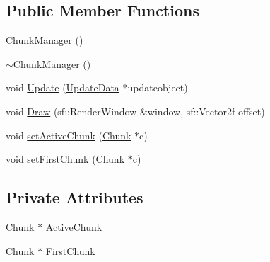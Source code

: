 \subsection*{Public Member Functions}
\begin{DoxyCompactItemize}
\item 
\hyperlink{class_chunk_manager_a5280c6347b5aa7f85660c66e3546bf87}{Chunk\-Manager} ()
\item 
\hyperlink{class_chunk_manager_a675cdb47d0529eee3c878fbc25406710}{$\sim$\-Chunk\-Manager} ()
\item 
void \hyperlink{class_chunk_manager_a601244f4c4a114fe2a646e4b5ad32a6e}{Update} (\hyperlink{class_update_data}{Update\-Data} $\ast$updateobject)
\item 
void \hyperlink{class_chunk_manager_a9cb7e15589f54b6937a2b12711403450}{Draw} (sf\-::\-Render\-Window \&window, sf\-::\-Vector2f offset)
\item 
void \hyperlink{class_chunk_manager_a00cea265f033fdc3b2188b1099094f08}{set\-Active\-Chunk} (\hyperlink{class_chunk}{Chunk} $\ast$c)
\item 
void \hyperlink{class_chunk_manager_a0b4794622d5e281a55f9bc99950201dc}{set\-First\-Chunk} (\hyperlink{class_chunk}{Chunk} $\ast$c)
\end{DoxyCompactItemize}
\subsection*{Private Attributes}
\begin{DoxyCompactItemize}
\item 
\hyperlink{class_chunk}{Chunk} $\ast$ \hyperlink{class_chunk_manager_a8008f62926fe10f46ac59001aae2d372}{Active\-Chunk}
\item 
\hyperlink{class_chunk}{Chunk} $\ast$ \hyperlink{class_chunk_manager_afb87cd5dd3cb61f09a6038d1796719ba}{First\-Chunk}
\end{DoxyCompactItemize}


